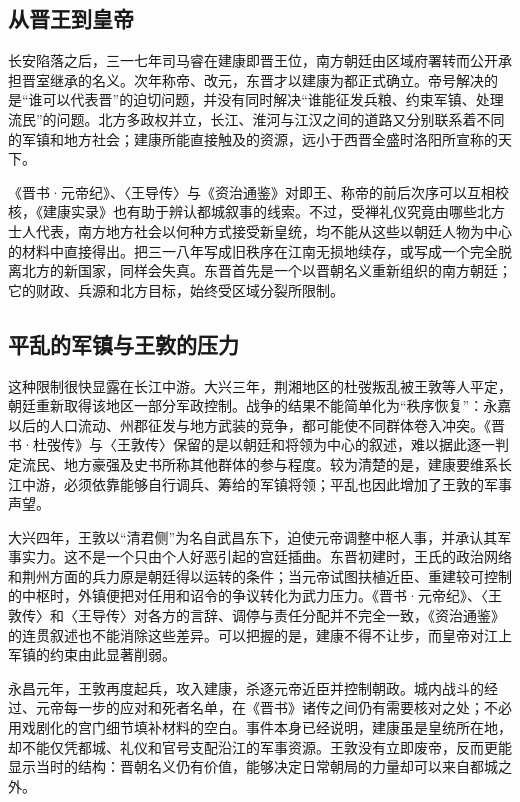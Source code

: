 \subsection{从晋王到皇帝}

长安陷落之后，三一七年司马睿在建康即晋王位，南方朝廷由区域府署转而公开承担晋室继承的名义。次年称帝、改元，东晋才以建康为都正式确立。帝号解决的是“谁可以代表晋”的迫切问题，并没有同时解决“谁能征发兵粮、约束军镇、处理流民”的问题。北方多政权并立，长江、淮河与江汉之间的道路又分别联系着不同的军镇和地方社会；建康所能直接触及的资源，远小于西晋全盛时洛阳所宣称的天下。

《晋书·元帝纪》、〈王导传〉与《资治通鉴》对即王、称帝的前后次序可以互相校核，《建康实录》也有助于辨认都城叙事的线索。不过，受禅礼仪究竟由哪些北方士人代表，南方地方社会以何种方式接受新皇统，均不能从这些以朝廷人物为中心的材料中直接得出。把三一八年写成旧秩序在江南无损地续存，或写成一个完全脱离北方的新国家，同样会失真。东晋首先是一个以晋朝名义重新组织的南方朝廷；它的财政、兵源和北方目标，始终受区域分裂所限制。

\subsection{平乱的军镇与王敦的压力}

这种限制很快显露在长江中游。大兴三年，荆湘地区的杜弢叛乱被王敦等人平定，朝廷重新取得该地区一部分军政控制。战争的结果不能简单化为“秩序恢复”：永嘉以后的人口流动、州郡征发与地方武装的竞争，都可能使不同群体卷入冲突。《晋书·杜弢传》与〈王敦传〉保留的是以朝廷和将领为中心的叙述，难以据此逐一判定流民、地方豪强及史书所称其他群体的参与程度。较为清楚的是，建康要维系长江中游，必须依靠能够自行调兵、筹给的军镇将领；平乱也因此增加了王敦的军事声望。

大兴四年，王敦以“清君侧”为名自武昌东下，迫使元帝调整中枢人事，并承认其军事实力。这不是一个只由个人好恶引起的宫廷插曲。东晋初建时，王氏的政治网络和荆州方面的兵力原是朝廷得以运转的条件；当元帝试图扶植近臣、重建较可控制的中枢时，外镇便把对任用和诏令的争议转化为武力压力。《晋书·元帝纪》、〈王敦传〉和〈王导传〉对各方的言辞、调停与责任分配并不完全一致，《资治通鉴》的连贯叙述也不能消除这些差异。可以把握的是，建康不得不让步，而皇帝对江上军镇的约束由此显著削弱。

永昌元年，王敦再度起兵，攻入建康，杀逐元帝近臣并控制朝政。城内战斗的经过、元帝每一步的应对和死者名单，在《晋书》诸传之间仍有需要核对之处；不必用戏剧化的宫门细节填补材料的空白。事件本身已经说明，建康虽是皇统所在地，却不能仅凭都城、礼仪和官号支配沿江的军事资源。王敦没有立即废帝，反而更能显示当时的结构：晋朝名义仍有价值，能够决定日常朝局的力量却可以来自都城之外。

